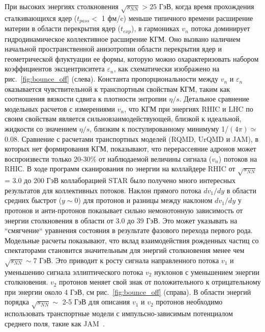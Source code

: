 При высоких энергиях столкновения $\sqrt{s_{NN}} > 25$ ГэВ, когда время прохождения сталкивающихся ядер ($t_{pass}<$ 1 фм/c) меньше типичного времени расширение  материи в области перекрытия ядер ($t_{exp}$), в гармониках $v_n$ потока доминирует гидродинамическое коллективное расширение КГМ. 
Оно вызвано наличием начальной пространственной анизотропии области перекрытия ядер и геометрической флуктуации ее формы, которую можно охарактеризовать набором коэффициентов эксцентриситета $\varepsilon_n$, как схематически изображено на рис.~\ref{fig:bounce_off} (слева).
Константа пропорциональности между $v_n$  и $\varepsilon_n$ оказывается чувствительной к транспортным свойствам КГМ, таким как соотношения вязкости сдвига к плотности энтропии $\eta/s$.
Детальное сравнение модельных расчетов с измерениями $v_n$, что КГМ при энергиях RHIC и LHC по своим свойствам является сильновзаимодействующей, близкой к идеальной, жидкости со значением $\eta/s$, близким к постулированному минимуму 1/$(4\pi) \simeq$ 0.08.
Сравнение с расчетами транспортных моделей (RQMD, UrQMD и JAM), в которых нет формирования КГМ, показывают, что перерассеяние адронов может воспроизвести только 20-30\% от наблюдаемой величины сигнала  ($v_n$) потоков на RHIС.
В ходе программ сканирования по энергии на коллайдере RHIC от $\sqrt{s_{NN}}$ = 3.0 до 200 ГэВ коллаборацией STAR было получено много интересных результатов для коллективных потоков.
Наклон прямого потока $dv_1/dy$ в области средних быстрот ($y \sim 0$) для протонов и разницы между наклоном $dv_1/dy$ у протонов и анти-протонов показывает сильно немонотонную зависимость от энергии столкновения в области от 3.0 до 39 ГэВ. 
Это может указывать на “смягчение“ уравнения состояния в результате фазового перехода первого рода. 
Модельные расчеты показывают, что вклад взаимодействия рожденных частиц со спектаторами становится значительным для энергий столкновения менее чем $\sqrt{s_{NN}}\sim$7 ГэВ. 
Это приводит к росту сигнала направленного потока $v_1$ и уменьшению сигнала эллиптического потока $v_2$ нуклонов с уменьшением энергии столкновения. 
$v_2$ протонов меняет свой знак  от положительного к отрицательному при энергии около 4 ГэВ, см рис.~\ref{fig:bounce_off} (справа). 
В области энергий порядка $\sqrt{s_{NN}}\sim$ 2-5 ГэВ для описания $v_1$ и $v_2$ протонов необходимо использовать транспортные модели с импульсно-зависимым потенциалом среднего поля, такие как JAM~\cite{nara2019jam}.


